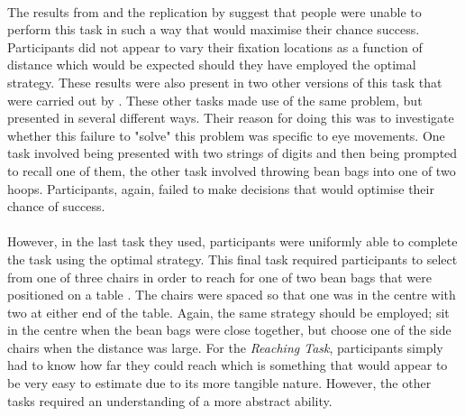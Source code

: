 \documentclass[12pt]{article}
\begin{document}
\paragraph{} The results from \cite{morvan2012human} and the replication by \cite{clarke2015failure} suggest that people were unable to perform this task in such a way that would maximise their chance success. Participants did not appear to vary their fixation locations as a function of distance which would be expected should they have employed the optimal strategy. These results were also present in two other versions of this task that were carried out by \cite{clarke2015failure}. These other tasks made use of the same problem, but presented in several different ways. Their reason for doing this was to investigate whether this failure to "solve" this problem was specific to eye movements. One task involved being presented with two strings of digits and then being prompted to recall one of them, the other task involved throwing bean bags into one of two hoops. Participants, again, failed to make decisions that would optimise their chance of success.


\paragraph{} However, in the last task they used, participants were uniformly able to complete the task using the optimal strategy. This final task required participants to select from one of three chairs in order to reach for one of two bean bags that were positioned on a table \citep{clarke2015failure}. The chairs were spaced so that one was in the centre with two at either end of the table. Again, the same strategy should be employed; sit in the centre when the bean bags were close together, but choose one of the side chairs when the distance was large. For the \textit{Reaching Task}, participants simply had to know how far they could reach which is something that would appear to be very easy to estimate due to its more tangible nature. However, the other tasks required an understanding of a more abstract ability.
\end{document}
